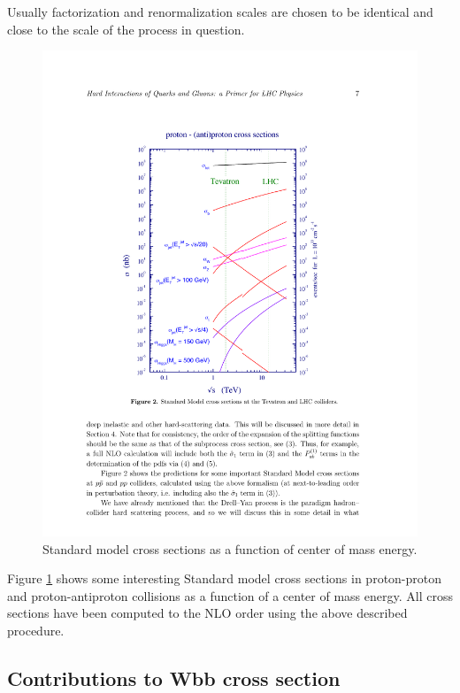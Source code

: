 \par Usually factorization and renormalization scales are chosen to be identical and close to the scale of the process in question.   
\begin{figure}[htbp]
	\centering
		\includegraphics{Figures/pp_xsec.pdf}
	\caption[Proton-proton cross sections]{Standard model cross sections as a function of center of mass energy.\cite{Campbell:2006wx} }
	\label{fig:pp_xsec}
\end{figure}
\par Figure \ref{fig:pp_xsec} shows some interesting Standard model cross sections in proton-proton and proton-antiproton collisions as a function of a center of mass energy. All cross sections have been computed to the NLO order using the above described procedure.

 

\subsection{Contributions to Wbb cross section}

